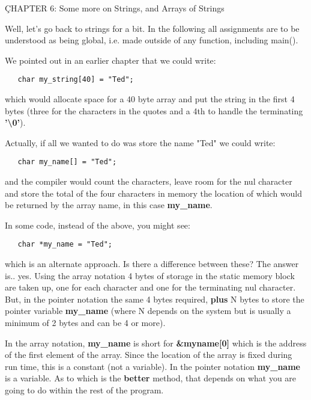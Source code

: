 \hypertarget{chapter-6-some-more-on-strings-and-arrays-of-strings}{%
\c{CHAPTER 6: Some more on Strings, and Arrays of
Strings}\label{chapter-6-some-more-on-strings-and-arrays-of-strings}}

Well, let's go back to strings for a bit. In the following all
assignments are to be understood as being global, i.e. made outside of
any function, including main().

We pointed out in an earlier chapter that we could write:

\begin{verbatim}
   char my_string[40] = "Ted";
\end{verbatim}

which would allocate space for a 40 byte array and put the string in the
first 4 bytes (three for the characters in the quotes and a 4th to
handle the terminating \textbf{'\textbackslash0'}).

Actually, if all we wanted to do was store the name "Ted" we could
write:

\begin{verbatim}
   char my_name[] = "Ted";
\end{verbatim}

and the compiler would count the characters, leave room for the nul
character and store the total of the four characters in memory the
location of which would be returned by the array name, in this case
\textbf{my\_name}.

In some code, instead of the above, you might see:

\begin{verbatim}
   char *my_name = "Ted";
\end{verbatim}

which is an alternate approach. Is there a difference between these? The
answer is.. yes. Using the array notation 4 bytes of storage in the
static memory block are taken up, one for each character and one for the
terminating nul character. But, in the pointer notation the same 4 bytes
required, \textbf{plus} N bytes to store the pointer variable
\textbf{my\_name} (where N depends on the system but is usually a
minimum of 2 bytes and can be 4 or more).

In the array notation, \textbf{my\_name} is short for
\textbf{\&myname{[}0{]}} which is the address of the first element of
the array. Since the location of the array is fixed during run time,
this is a constant (not a variable). In the pointer notation
\textbf{my\_name} is a variable. As to which is the \textbf{better}
method, that depends on what you are going to do within the rest of the
program.

